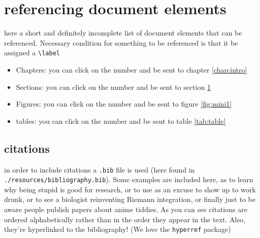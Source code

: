 \documentclass[../thesis.tex]{subfiles}
\begin{document}
\section{referencing document elements} \label{sec:ref}
here a short and definitely incomplete list of document elements that can be referenced. Necessary condition for something to be referenced is that it be assigned a \verb|\label|
\begin{itemize}
    \item Chapters: you can click on the number and be sent to chapter \ref{chap:intro}  
    \item Sections: you can click on the number and be sent to section \ref{sec:ref}
    \item Figures: you can click on the number and be sent to figure \ref{fig:mini1}
    \item tables: you can click on the number and be sent to table \ref{tab:table}
\end{itemize}
\subsection{citations}
in order to include citations a \verb|.bib| file is used (here found in \verb|./resources/bibliography.bib|). Some examples are included here, as \cite{dumb} to learn why being stupid is good for research, or \cite{drinking} to use as an excuse to show up to work drunk, or \cite{integration} to see a biologist reinventing Riemann integration, or finally \cite{booba} just to be aware people publish papers about anime tiddies. As you can see citations are ordered alphabetically rather than in the order they appear in the text. Also, they're hyperlinked to the bibliography! (We love the \verb|hyperref| package)
\end{document}
